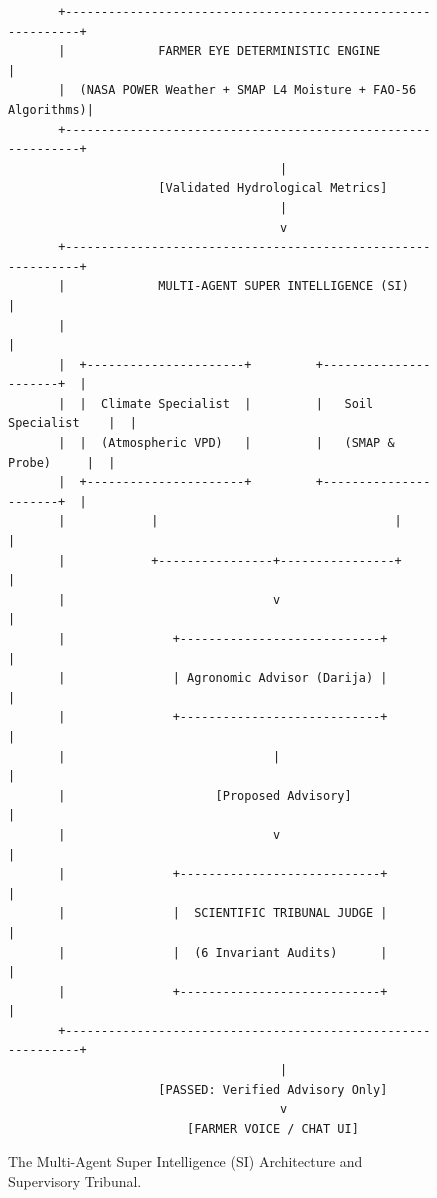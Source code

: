 \documentclass[11pt,a4paper,oneside]{report}
\begin{document}
\begin{figure}[h!]
\centering
\begin{verbatim}
       +-------------------------------------------------------------+
       |             FARMER EYE DETERMINISTIC ENGINE                 |
       |  (NASA POWER Weather + SMAP L4 Moisture + FAO-56 Algorithms)|
       +-------------------------------------------------------------+
                                      |
                     [Validated Hydrological Metrics]
                                      |
                                      v
       +-------------------------------------------------------------+
       |             MULTI-AGENT SUPER INTELLIGENCE (SI)             |
       |                                                             |
       |  +----------------------+         +----------------------+  |
       |  |  Climate Specialist  |         |   Soil Specialist    |  |
       |  |  (Atmospheric VPD)   |         |   (SMAP & Probe)     |  |
       |  +----------------------+         +----------------------+  |
       |            |                                 |              |
       |            +----------------+----------------+              |
       |                             v                               |
       |               +----------------------------+                |
       |               | Agronomic Advisor (Darija) |                |
       |               +----------------------------+                |
       |                             |                               |
       |                     [Proposed Advisory]                     |
       |                             v                               |
       |               +----------------------------+                |
       |               |  SCIENTIFIC TRIBUNAL JUDGE |                |
       |               |  (6 Invariant Audits)      |                |
       |               +----------------------------+                |
       +-------------------------------------------------------------+
                                      |
                     [PASSED: Verified Advisory Only]
                                      v
                         [FARMER VOICE / CHAT UI]
\end{verbatim}
\caption{The Multi-Agent Super Intelligence (SI) Architecture and Supervisory Tribunal.}
\label{fig:si_architecture}
\end{figure}
\end{document}
